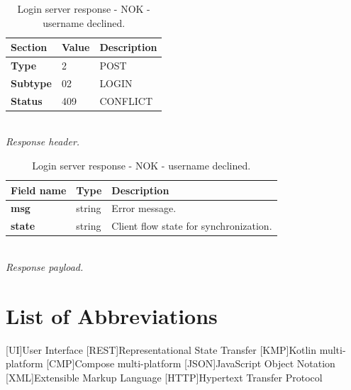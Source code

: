 \documentclass[english, sem, kiv, he, iso690alph, pdf, viewonly]{fasthesis}
\begin{document}
\begin{table}[h]
	\centering
	\begin{minipage}[b]{0.45\textwidth}
		\centering
		\begin{tabular}{|l|l|l|}
			\hline
			\textbf{Section} & \textbf{Value} & \textbf{Description} \\ \hline
			\textbf{Type} & 2 & POST \\ \hline
			\textbf{Subtype} & 02 & LOGIN \\ \hline
			\textbf{Status} & 409 & CONFLICT \\ \hline
		\end{tabular} \\
		\textit{Response header.}
	\end{minipage} 
	\hfill
	\begin{minipage}[b]{0.45\textwidth}
		\centering
		\begin{tabular}{|l|l|p{95pt}|}
			\hline
			\textbf{Field name} & \textbf{Type} & \textbf{Description} \\ \hline
			\textbf{msg} & string & Error message. \\ \hline
			\textbf{state} & string & Client flow state for synchronization. \\ \hline
		\end{tabular} \\
		\textit{Response payload.}
	\end{minipage}	
	\caption{Login server response - NOK - username declined.}
	\label{tab:login_server_response_nok}
\end{table}


%
%
%
%

\appendix
%
%
%
%
\chapter{List of Abbreviations}\label{app:abbreviations}

\begin{acronym}
[UI]{User Interface}
[REST]{Representational State Transfer}
[KMP]{Kotlin multi-platform}
[CMP]{Compose multi-platform}
[JSON]{JavaScript Object Notation}
[XML]{Extensible Markup Language}
[HTTP]{Hypertext Transfer Protocol}
\end{acronym}
\end{document}
